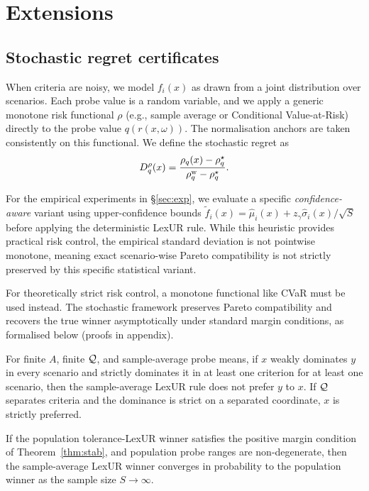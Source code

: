 \section{Extensions}
\label{sec:ext}

\subsection{Stochastic regret certificates}
When criteria are noisy, we model $f_i(x)$ as drawn from a joint distribution over scenarios. Each probe value is a random variable, and we apply a generic monotone risk functional $\rho$ (e.g., sample average or Conditional Value-at-Risk) directly to the probe value $q(r(x,\omega))$. The normalisation anchors are taken consistently on this functional. We define the stochastic regret as
\begin{equation}
D_q^\rho(x)=\frac{\rho_q(x)-\rho_q^\star}{\rho_q^{\mathrm w}-\rho_q^\star}.
\end{equation}

For the empirical experiments in \S\ref{sec:exp}, we evaluate a specific \emph{confidence-aware} variant using upper-confidence bounds $\tilde f_i(x)=\hat\mu_i(x)+z_{\gamma}\hat\sigma_i(x)/\sqrt{S}$ before applying the deterministic LexUR rule. While this heuristic provides practical risk control, the empirical standard deviation is not pointwise monotone, meaning exact scenario-wise Pareto compatibility is not strictly preserved by this specific statistical variant. 

For theoretically strict risk control, a monotone functional like CVaR must be used instead. The stochastic framework preserves Pareto compatibility and recovers the true winner asymptotically under standard margin conditions, as formalised below (proofs in appendix).

\begin{proposition}
\label{thm:stoch}
For finite $A$, finite $\mathcal{Q}$, and sample-average probe means, if $x$ weakly dominates $y$ in every scenario and strictly dominates it in at least one criterion for at least one scenario, then the sample-average LexUR rule does not prefer $y$ to $x$. If $\mathcal{Q}$ separates criteria and the dominance is strict on a separated coordinate, $x$ is strictly preferred.
\end{proposition}

\begin{proposition}
\label{thm:stoch2}
If the population tolerance-LexUR winner satisfies the positive margin condition of Theorem~\ref{thm:stab}, and population probe ranges are non-degenerate, then the sample-average LexUR winner converges in probability to the population winner as the sample size $S\to\infty$.
\end{proposition}

